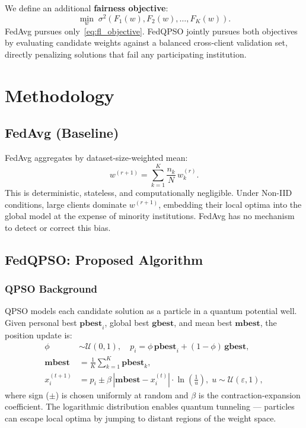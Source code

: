 \documentclass[conference]{IEEEtran}
\begin{document}
We define an additional \textbf{fairness objective}:
\begin{equation}
    \min_{w}\; \sigma^2\!\left(F_1(w), F_2(w), \ldots, F_K(w)\right).
    \label{eq:fairness_objective}
\end{equation}
FedAvg pursues only~\eqref{eq:fl_objective}. FedQPSO jointly pursues
both objectives by evaluating candidate weights against a balanced
cross-client validation set, directly penalizing solutions that fail any
participating institution.

\section{Methodology}
\label{sec:method}

\subsection{FedAvg (Baseline)}
FedAvg \cite{mcmahan2017} aggregates by dataset-size-weighted mean:
\begin{equation}
    w^{(r+1)} = \sum_{k=1}^{K} \frac{n_k}{N}\, w_k^{(r)}.
    \label{eq:fedavg}
\end{equation}
This is deterministic, stateless, and computationally negligible. Under
Non-IID conditions, large clients dominate $w^{(r+1)}$, embedding their
local optima into the global model at the expense of minority institutions.
FedAvg has no mechanism to detect or correct this bias.

\subsection{FedQPSO: Proposed Algorithm}

\subsubsection{QPSO Background}
QPSO \cite{sun2004qpso} models each candidate solution as a particle in a
quantum potential well. Given personal best $\mathbf{pbest}_i$, global best
$\mathbf{gbest}$, and mean best $\mathbf{mbest}$, the position update is:
\begin{align}
    \phi &\sim \mathcal{U}(0,1), \quad
    p_i = \phi\,\mathbf{pbest}_i + (1-\phi)\,\mathbf{gbest},
    \label{eq:attractor}\\
    \mathbf{mbest} &= \frac{1}{K}\sum_{k=1}^{K}\mathbf{pbest}_k,
    \label{eq:mbest}\\
    x_i^{(t+1)} &= p_i \pm \beta\,|{\mathbf{mbest}} - x_i^{(t)}|
    \cdot \ln\!\left(\frac{1}{u}\right), \; u \sim \mathcal{U}(\varepsilon,1),
    \label{eq:qpso_update}
\end{align}
where sign ($\pm$) is chosen uniformly at random and $\beta$ is the
contraction-expansion coefficient. The logarithmic distribution enables
quantum tunneling — particles can escape local optima by jumping to distant
regions of the weight space.
\end{document}

